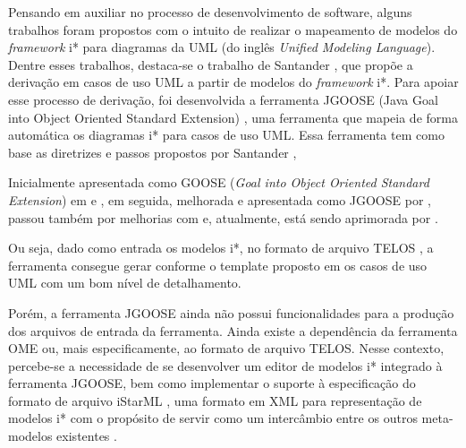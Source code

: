             Pensando em auxiliar no processo de desenvolvimento de software,
            alguns trabalhos foram propostos com o intuito de realizar o mapeamento
            de modelos do \emph{framework} i*
            para diagramas da UML (do inglês \emph{Unified   Modeling   Language}).
            Dentre esses trabalhos, destaca-se o trabalho de Santander \cite{santander2002integrando},
            que propõe a derivação em casos de uso UML a partir de modelos do \emph{framework} i*.
                Para apoiar esse processo de derivação,
                foi desenvolvida a ferramenta JGOOSE (Java Goal into Object Oriented Standard Extension) \cite{vicente2006},
                uma ferramenta que mapeia de forma automática os diagramas i* para casos de uso UML.
                Essa ferramenta tem como base as diretrizes e passos propostos por Santander \cite{santander2002integrando},


                Inicialmente apresentada como GOOSE (\emph{Goal into Object Oriented Standard Extension}) em
                    \cite{pedroza2004ferramentas}
                    e
                    \cite{brischke2005desenvolvimento},
                em seguida, melhorada e apresentada como JGOOSE por
                    \cite{vicente2009},
                passou também por melhorias com
                    \cite{brischke2012melhorando}
                e, atualmente,
                está sendo aprimorada por
                    \cite{peliser2013aprimorando}.

                Ou seja, dado como entrada os modelos i*, no formato de arquivo TELOS
                    \cite{mylopoulos1990telos}
                    \cite{koubarakis1989telos},
                a ferramenta consegue gerar conforme o template proposto em
                    \cite{cockburn2001writing}
                os casos de uso UML com um bom nível de detalhamento.

                Porém, a ferramenta JGOOSE ainda não possui funcionalidades para a produção dos arquivos de entrada da ferramenta.
                Ainda existe a dependência da ferramenta OME ou, mais especificamente, ao formato de arquivo TELOS.
                Nesse contexto, percebe-se a necessidade de se desenvolver um editor de modelos i* integrado à ferramenta JGOOSE,
                bem como implementar o suporte à especificação do formato de arquivo iStarML
                    \cite{cares2007istarml},
                uma formato em XML
                para representação de modelos i*
                com o propósito de servir como um intercâmbio entre os outros meta-modelos existentes
                    \cite{colomer2011model}.

